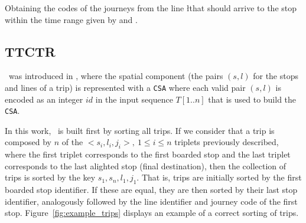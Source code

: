     \begin{algorithm}[ht]
     
     
     \caption{Obtaining the codes of the journeys from the line \l that should arrive to the stop \s within the time range given by \ta and \tz.}
     \label{alg:jcodes}
    \end{algorithm}
    
    \subsection{TTCTR}
    \ttctr~was introduced in \cite{brisaboa2018new}, where the spatial component (the pairs $(s,l)$ for the stops and lines of a trip) is represented with a \texttt{CSA} where each valid pair $(s,l)$ is encoded as an integer $id$ in the input sequence $T[1..n]$ that is used to build the \texttt{CSA}.

    In this work, \ttctr~is built first by sorting all trips. If we consider that a trip is composed by $n$ of the $<s_i,l_i,j_i>,~1\leq i\leq n$ triplets previously described, where the first triplet corresponds to the first boarded stop and the last triplet corresponds to the last alighted stop (final destination), then the collection of trips is sorted by the key $s_1,s_n,l_1,j_1$. That is, trips are initially sorted by the first boarded stop identifier. If these are equal, they are then sorted by their last stop identifier, analogously followed by the line identifier and journey code of the first stop. Figure~\ref{fig:example_trips} displays an example of a correct sorting of trips.
    
